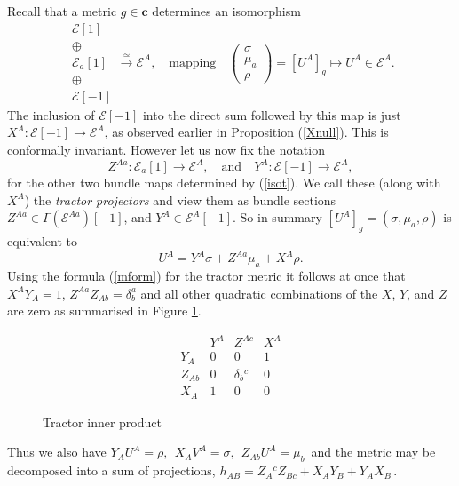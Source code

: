 \documentclass[a4paper,12pt]{amsart}
\def\Cal{\mathcal}
\newcommand{\cc}{\boldsymbol{c}}
\newcommand{\ce}{{\Cal E}}
\newcommand{\si}{\sigma}
\theoremstyle{remark}
\newcommand{\nn}[1]{(\ref{#1})}
\begin{document}
Recall that a metric $g\in \cc$ determines an isomorphism 
\begin{equation}\label{isot}
 \begin{array}{c}
\mathcal{E}[1] \\ 
\oplus \\ 
\mathcal{E}_a[1] \\ 
\oplus\\ 
\mathcal{E}[-1]
\end{array}  \stackrel{\simeq}{\longrightarrow} \ce^A, \quad
\mbox{mapping}
\quad 
 \left(\begin{array}{c} \si\\
\mu_a\\ 
\rho
\end{array}\right) =[U^A]_g \mapsto U^A\in \ce^A.
\end{equation} 
The inclusion of $\ce[-1]$ into the direct sum followed by this map is just 
$X^A:\ce[-1]\to \ce^A$, as observed earlier in Proposition \nn{Xnull}.
This is conformally invariant. However let
us now fix the notation
\begin{equation}\label{YZ}
Z^{Aa}: \mathcal{E}_a[1]\to \ce^A, \quad
\mbox{and}
\quad
Y^A: \ce[-1]\to \ce^A ,
\end{equation}
for the other two bundle maps determined by \nn{isot}. We call these (along with $X^A$) 
the {\em tractor projectors} and view them as bundle sections
$Z^{Aa}\in \Gamma(\ce^{Aa})[-1]$, and $Y^A\in \ce^A[-1]$.
So in summary $[U^A]_g=(\si,\mu_a,\rho)$ is equivalent to 
\begin{equation}\label{Uform}
U^A= Y^A\si + Z^{Aa}\mu_a +X^A \rho .
\end{equation}
Using the formula \nn{mform} for the tractor metric it follows at once that 
$X^AY_A=1$, $Z^{Aa}Z_{Ab}=\delta^a_b$ and all other quadratic combinations of the 
$X$, $Y$, and $Z$ are zero as summarised in Figure \ref{tmf}.
\begin{figure}[ht]
$$
\begin{array}{l|ccc}
%
& Y^A & Z^{Ac} & X^{A}
\\
\hline
Y_{A} & 0 & 0 & 1
\\
Z_{Ab} & 0 & \delta_{b}{}^{c} & 0
\\
X_{A} & 1 & 0 & 0
%
\end{array}
$$
\caption{Tractor inner product}
\label{tmf}
\end{figure}
Thus we also have
$
Y_AU^A=\rho,\ \ X_AV^A=\si,\ \ Z_{Ab}U^A=\mu_b\, $
and the metric may be decomposed into a sum of projections, $
h_{AB}=Z_A{}^cZ_{Bc}+X_AY_B+Y_AX_B\,$.
\end{document}
